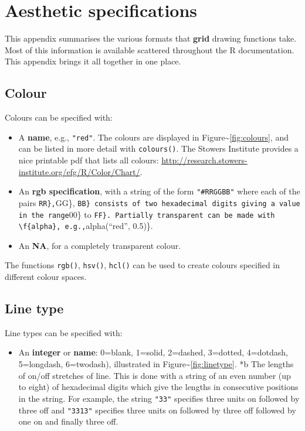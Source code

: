 \chapter{Aesthetic specifications}\label{cha:specifications}

This appendix summarises the various formats that \textbf{grid} drawing
functions take. Most of this information is available scattered
throughout the R documentation. This appendix brings it all together in
one place. 

\section{Colour}\label{sec:colourux5fspec}

Colours can be specified with: 

\begin{itemize}
\itemsep1pt\parskip0pt
\item
  A \textbf{name}, e.g., \texttt{"red"}. The colours are displayed in
  Figure\textasciitilde{}\ref{fig:colours}, and can be listed in more
  detail with \texttt{colours()}. The Stowers Institute provides a nice
  printable pdf that lists all colours:
  \url{http://research.stowers-institute.org/efg/R/Color/Chart/}.
\item
  An \textbf{rgb specification}, with a string of the form
  \texttt{"\#RRGGBB"} where each of the pairs \texttt{RR\},}GG\},
  \texttt{BB\} consists of two hexadecimal digits giving a value in the range}00\}
  to
  \texttt{FF\}.  Partially transparent can be made with \textbackslash{}f\{alpha\}, e.g.,}alpha(``red'',
  0.5)\}.
\item
  An \textbf{NA}, for a completely transparent colour.
\end{itemize}

The functions \texttt{rgb()}, \texttt{hsv()}, \texttt{hcl()} can be used
to create colours specified in different colour spaces.

\section{Line type}\label{sec:line-type-spec}

Line types can be specified with: 

\begin{itemize}
\itemsep1pt\parskip0pt
\item
  An \textbf{integer} or \textbf{name}: 0=blank, 1=solid, 2=dashed,
  3=dotted, 4=dotdash, 5=longdash, 6=twodash), illustrated in
  Figure\textasciitilde{}\ref{fig:linetype}. *b The lengths of on/off
  stretches of line. This is done with a string of an even number (up to
  eight) of hexadecimal digits which give the lengths in consecutive
  positions in the string. For example, the string \texttt{"33"}
  specifies three units on followed by three off and \texttt{"3313"}
  specifies three units on followed by three off followed by one on and
  finally three off.
\end{itemize}

